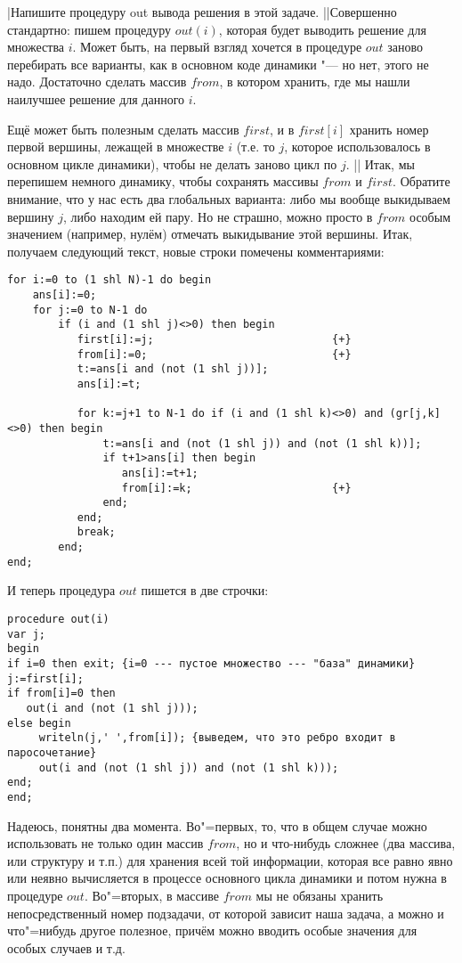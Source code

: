 \task|Напишите процедуру out вывода решения в этой задаче.
||Совершенно стандартно: пишем процедуру $out(i)$, которая будет выводить решение для множества 
$i$. Может быть, на первый взгляд хочется в процедуре $out$ заново перебирать все варианты, как в 
основном коде динамики "--- но нет, этого не надо. Достаточно сделать массив $from$, в котором 
хранить, где мы нашли наилучшее решение для данного $i$. 

Ещё может быть полезным сделать массив $first$, и в $first[i]$ хранить номер первой вершины, 
лежащей в множестве $i$ (т.е. то $j$, которое использовалось в основном цикле динамики), чтобы не 
делать заново цикл по $j$.
||
Итак, мы перепишем немного динамику, чтобы сохранять массивы $from$ и $first$. Обратите внимание, 
что у нас есть два глобальных варианта: либо мы вообще выкидываем вершину $j$, либо находим ей 
пару. Но не страшно, можно просто в $from$ особым значением (например, нулём) отмечать выкидывание 
этой вершины. Итак, получаем следующий текст, новые строки помечены комментариями:
\begin{codesampleo}\begin{verbatim}
for i:=0 to (1 shl N)-1 do begin
    ans[i]:=0;
    for j:=0 to N-1 do 
        if (i and (1 shl j)<>0) then begin 
           first[i]:=j;                            {+}
           from[i]:=0;                             {+}
           t:=ans[i and (not (1 shl j))];  
           ans[i]:=t;     

           for k:=j+1 to N-1 do if (i and (1 shl k)<>0) and (gr[j,k]<>0) then begin 
               t:=ans[i and (not (1 shl j)) and (not (1 shl k))];   
               if t+1>ans[i] then begin
                  ans[i]:=t+1;
                  from[i]:=k;                      {+}
               end;
           end;
           break;
        end;
end;
\end{verbatim}
\end{codesampleo}
И теперь процедура $out$ пишется в две строчки:
\begin{codesampleo}\begin{verbatim}
procedure out(i)
var j;
begin
if i=0 then exit; {i=0 --- пустое множество --- "база" динамики}
j:=first[i];
if from[i]=0 then 
   out(i and (not (1 shl j)));
else begin
     writeln(j,' ',from[i]); {выведем, что это ребро входит в паросочетание}
     out(i and (not (1 shl j)) and (not (1 shl k)));
end;
end;
\end{verbatim}
\end{codesampleo}

Надеюсь, понятны два момента. Во"=первых, то, что в общем случае можно использовать не только 
один массив $from$, но и что-нибудь сложнее (два массива, или структуру и т.п.) для хранения всей 
той информации, которая все равно явно или неявно вычисляется в процессе основного цикла динамики и 
потом нужна в процедуре $out$. Во"=вторых, в массиве $from$ мы не обязаны хранить непосредственный 
номер подзадачи, от которой зависит наша задача, а можно и что"=нибудь другое полезное, причём 
можно вводить особые значения для особых случаев и т.д.

